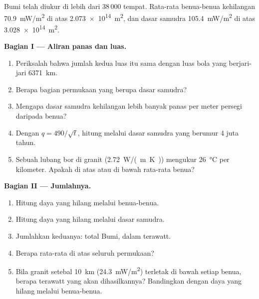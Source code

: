 \begin{problem}
\label{pb:g12:internal-heat:1}
 Bumi telah diukur di lebih dari 38\,000 tempat.
Rata-rata benua-benua kehilangan \qty{70.9}{mW/m^2} di atas \qty{2.073e14}{m^2},
dan dasar samudra \qty{105.4}{mW/m^2} di atas \qty{3.028e14}{m^2}.

\medskip
\noindent\textbf{Bagian I --- Aliran panas dan luas.}
\begin{enumerate}
  \item Periksalah bahwa jumlah kedua luas itu sama dengan luas bola yang
        berjari-jari \qty{6371}{km}.
  \item Berapa bagian permukaan yang berupa dasar samudra?
  \item Mengapa dasar samudra kehilangan lebih banyak panas per meter persegi
        daripada benua?
  \item Dengan $q = 490/\sqrt{t}$, hitung  melalui dasar samudra
        yang berumur 4 juta tahun.
  \item Sebuah lubang bor di granit (\qty{2.72}{W/(m.K)}) mengukur
        \qty{26}{\celsius} per kilometer. Apakah  di atas atau
        di bawah rata-rata benua?
\end{enumerate}

\medskip
\noindent\textbf{Bagian II --- Jumlahnya.}
\begin{enumerate}[resume]
  \item Hitung daya yang hilang melalui benua-benua.
  \item Hitung daya yang hilang melalui dasar samudra.
  \item Jumlahkan keduanya:  total Bumi, dalam terawatt.
  \item Berapa  rata-rata di atas seluruh permukaan?
  \item Bila granit setebal \qty{10}{km} (\qty{24.3}{mW/m^2}) terletak di
        bawah setiap benua, berapa terawatt yang akan dihasilkannya? Bandingkan
        dengan daya yang hilang melalui benua-benua.
\end{enumerate}


\end{problem}
